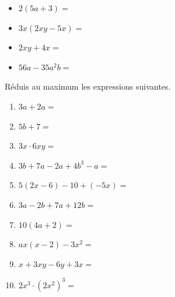 \documentclass[../math2.tex]{subfiles}
\begin{document}
\vspace*{1cm}

\exemples
\begin{itemize}[cols=2, label=]
  \item $2\left(5a+3\right)=$
  \item $3x\left(2xy - 5x\right)=$
\end{itemize}


\vspace*{1cm}

\exemples
\begin{itemize}[cols=2, label=]
  \item $2xy+4x=$
  \item $56a - 35a^2b=$
\end{itemize}

\vspace*{2cm}

\begin{exercise}
  Réduis au maximum les expressions suivantes.
  \begin{enumerate}[cols=2, itemsep=1cm]
    \item  $3a+2a=$
    \item  $5b+7=$
    \item  $3x \cdot 6xy=$
    \item  $3b+7a-2a+4b^3-a=$
    \item  $5(2x - 6)- 10 + (-5x)=$
    \item  $3a-2b+7a+12b=$
    \item  $10\left(4a+2\right)=$
    \item  $ax\left(x-2\right) -3x^2=$
    \item  $x+3xy-6y+3x=$
    \item  $2x^3 \cdot (2x^2)^3=$
  \end{enumerate}
\end{exercise}
\vspace*{1cm}
\end{document}

